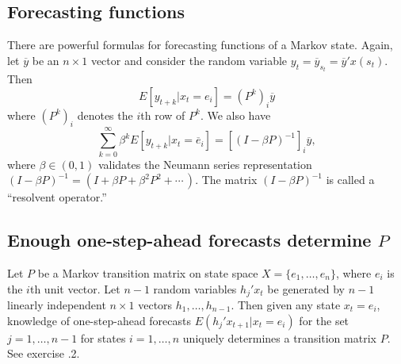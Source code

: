 \subsection{Forecasting functions}\label{sec:resolvent}%
 There are powerful formulas for forecasting functions
of a Markov state.
   Again, let $\overline y $ be an $n\times 1$ vector and
consider the random variable $y_t = \overline y_{s_t} =  \overline y' x(s_t)$.
Then
$$ E[y_{t+k} \vert x_t = e_i] =  (P^k)_i \overline y $$
where $(P^k)_i$ denotes the $i$th row of $P^k$.
We also have
$$  \sum_{k=0}^\infty \beta^k E [y_{t+k}  \vert x_t =
    \overline e_i ]
       = [ (I -\beta P)^{-1}]_i  \overline y ,$$
where $\beta \in (0,1)$ validates the Neumann series representation $(I -\beta P)^{-1}
= (I + \beta P + \beta^2 P^2 + \cdots \, )$.
The matrix $(I -\beta P)^{-1}$ is called a ``resolvent operator.''
%
%



\subsection{Enough one-step-ahead forecasts determine $P$}
Let $P$ be a Markov transition matrix on state space $X = \{ e_1, \ldots, e_n\}$,
where $e_i$ is the $i$th unit vector.  Let  $n-1$  random variables $h_j' x_t$ be
generated by $n-1$ linearly independent $n \times 1$ vectors $h_1, \ldots, h_{n-1}$.
Then given any state $x_t = e_i$, knowledge of one-step-ahead forecasts $E (h_j' x_{t+1} | x_t = e_i)$ for %
the set $j = 1, \ldots, n-1$ for states $i = 1, \ldots, n$ uniquely determines a transition matrix $P$.  See exercise  \the\chapternum.2.

